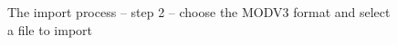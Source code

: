 \begin{figure}[!ht]
  \begin{center}
  \end{center}
  \caption[The import process – step 2]{The import process – step 2 – choose the MODV3 format and select a file to import}
  \label{fig:divaImport2}
\end{figure}
\FloatBarrier

